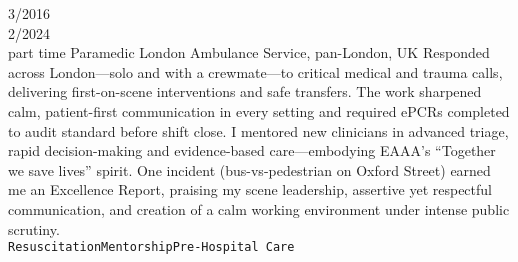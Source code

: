 \documentclass[9pt]{developercv} %
\begin{document}
\begin{minipage}[t]{0.61\textwidth}
\begin{entrylist}
		\entry
			{3/2016 \\2/2024\\\footnotesize{part time}}
			{Paramedic}
			{London Ambulance Service, pan-London, UK}
			{Responded across London—solo and with a crewmate—to critical medical and trauma calls, delivering first-on-scene interventions and safe transfers. The work sharpened calm, patient-first communication in every setting and required ePCRs completed to audit standard before shift close. I mentored new clinicians in advanced triage, rapid decision-making and evidence-based care—embodying EAAA’s “Together we save lives” spirit. One incident (bus-vs-pedestrian on Oxford Street) earned me an Excellence Report, praising my scene leadership, assertive yet respectful communication, and creation of a calm working environment under intense public scrutiny.\\ \texttt{Resuscitation}\slashsep\texttt{Mentorship}\slashsep\texttt{Pre-Hospital Care}}
			
	\end{entrylist}
	\end{minipage}
	\hfill %
\end{document}
